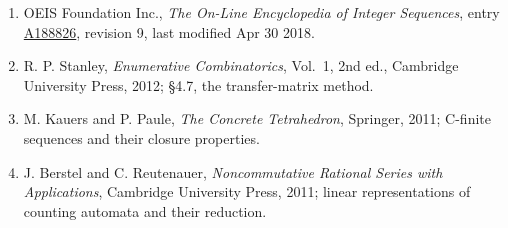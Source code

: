 \documentclass[11pt]{article}
\theoremstyle{definition}
\begin{document}
\begin{enumerate}

\item OEIS Foundation Inc., \emph{The On-Line Encyclopedia of Integer Sequences}, entry \href{https://oeis.org/A188826}{A188826}, revision 9, last modified Apr 30 2018.

\item R. P. Stanley, \emph{Enumerative Combinatorics}, Vol.~1, 2nd ed., Cambridge University Press, 2012; \S4.7, the transfer-matrix method.

\item M. Kauers and P. Paule, \emph{The Concrete Tetrahedron}, Springer, 2011; C-finite sequences and their closure properties.

\item J. Berstel and C. Reutenauer, \emph{Noncommutative Rational Series with Applications}, Cambridge University Press, 2011; linear representations of counting automata and their reduction.

\end{enumerate}
\end{document}
